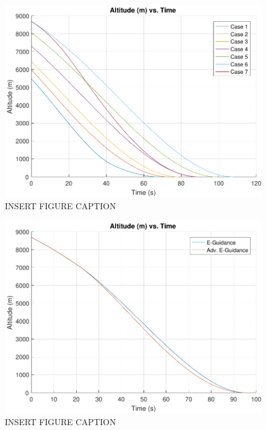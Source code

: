 \begin{figure}[H]
	\centering
	\begin{minipage}{4.5 in}
		\includegraphics[width=\linewidth]{Figures/altpowvac.pdf}
		\caption{INSERT FIGURE CAPTION \label{fig:altpowvac} }
	\end{minipage}
\end{figure}



\begin{figure}[H]
	\centering
	\begin{minipage}{4.5 in}
		\includegraphics[width=\linewidth]{Figures/altsimvsadv.pdf}
		\caption{INSERT FIGURE CAPTION \label{fig:altsimvsadv} }
	\end{minipage}
\end{figure}



